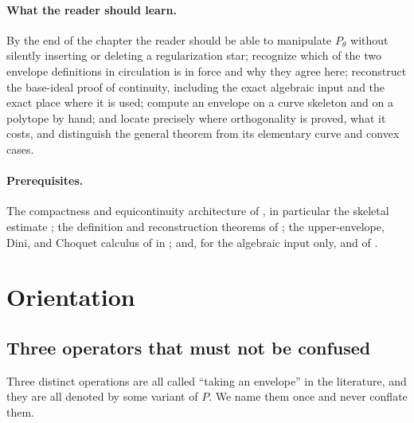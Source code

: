 \paragraph{What the reader should learn.}
By the end of the chapter the reader should be able to
manipulate $P_\theta$ without silently inserting or deleting a
regularization star; recognize which of the two envelope definitions in
circulation is in force and why they agree here; reconstruct the base-ideal
proof of continuity, including the exact algebraic input and the exact place
where it is used; compute an envelope on a curve skeleton and on a polytope
by hand; and locate precisely where orthogonality is proved, what it costs,
and distinguish the general theorem from its elementary curve and convex cases.

\paragraph{Prerequisites.}
The compactness and equicontinuity architecture of
, in particular the skeletal estimate
; the definition and reconstruction
theorems of ; the upper-envelope, Dini, and Choquet
calculus of  in ; and,
for the algebraic input only,  and
 of .

\section{Orientation}
\label{sec:ch23-orientation}

\subsection{Three operators that must not be confused}
\label{sec:ch23-three-operators}

Three distinct operations are all called ``taking an envelope'' in the
literature, and they are all denoted by some variant of $P$.  We name them
once and never conflate them.

